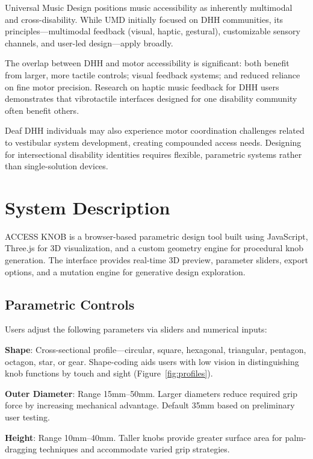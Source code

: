 \documentclass[sigconf]{nimeart}
\begin{document}
Universal Music Design\cite{hergert2024gestolumina} positions music accessibility as inherently multimodal and cross-disability. While UMD initially focused on DHH communities, its principles—multimodal feedback (visual, haptic, gestural), customizable sensory channels, and user-led design—apply broadly.

The overlap between DHH and motor accessibility is significant: both benefit from larger, more tactile controls; visual feedback systems; and reduced reliance on fine motor precision. Research on haptic music feedback for DHH users\cite{cavdir2022touch,cavdir2020felt} demonstrates that vibrotactile interfaces designed for one disability community often benefit others.

Deaf DHH individuals may also experience motor coordination challenges related to vestibular system development\cite{wink2018balance}, creating compounded access needs. Designing for intersectional disability identities requires flexible, parametric systems rather than single-solution devices.

\section{System Description}

ACCESS KNOB is a browser-based parametric design tool built using JavaScript, Three.js for 3D visualization, and a custom geometry engine for procedural knob generation. The interface provides real-time 3D preview, parameter sliders, export options, and a mutation engine for generative design exploration.

\subsection{Parametric Controls}

Users adjust the following parameters via sliders and numerical inputs:

\textbf{Shape}: Cross-sectional profile—circular, square, hexagonal, triangular, pentagon, octagon, star, or gear. Shape-coding aids users with low vision in distinguishing knob functions by touch and sight (Figure~\ref{fig:profiles}).

\textbf{Outer Diameter}: Range 15mm--50mm. Larger diameters reduce required grip force by increasing mechanical advantage. Default 35mm based on preliminary user testing.

\textbf{Height}: Range 10mm--40mm. Taller knobs provide greater surface area for palm-dragging techniques and accommodate varied grip strategies.
\end{document}
